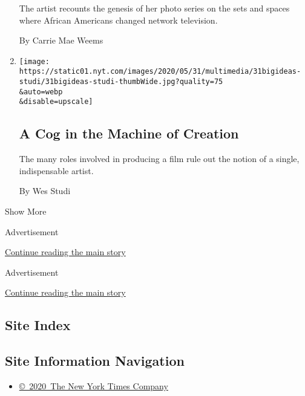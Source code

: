 \begin{enumerate}
  The artist recounts the genesis of her photo series on the sets and
  spaces where African Americans changed network television.

  By Carrie Mae Weems
\item
  \href{/2020/05/31/opinion/acting-movies-art.html}{}

  \texttt{[image: https://static01.nyt.com/images/2020/05/31/multimedia/31bigideas-studi/31bigideas-studi-thumbWide.jpg?quality=75\\\&auto=webp\\\&disable=upscale]}

  \hypertarget{a-cog-in-the-machine-of-creation}{%
  \subsection{A Cog in the Machine of
  Creation}\label{a-cog-in-the-machine-of-creation}}

  The many roles involved in producing a film rule out the notion of a
  single, indispensable artist.

  By Wes Studi
\end{enumerate}

Show More

Advertisement

\protect\hyperlink{after-mid1}{Continue reading the main story}

Advertisement

\protect\hyperlink{after-mktg}{Continue reading the main story}

\hypertarget{site-index}{%
\subsection{Site Index}\label{site-index}}

\hypertarget{site-information-navigation}{%
\subsection{Site Information
Navigation}\label{site-information-navigation}}

\begin{itemize}
\tightlist
\item
  \href{https://help.nytimes.com/hc/en-us/articles/115014792127-Copyright-notice}{©~2020~The
  New York Times Company}
\end{itemize}

